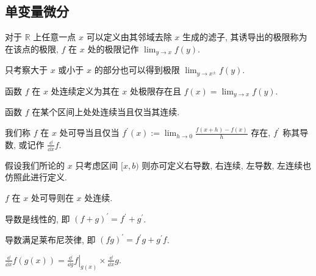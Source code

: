 \subsection{单变量微分}

\begin{definition}
    对于 \(\mathbb{R}\) 上任意一点 \(x\) 可以定义由其邻域去除 \(x\) 生成的滤子,
    其诱导出的极限称为在该点的极限, \(f\) 在 \(x\) 处的极限记作 \(\lim_{y \to x} f(y)\).
\end{definition}

\begin{definition}
    只考察大于 \(x\) 或小于 \(x\) 的部分也可以得到极限 \(\lim_{y \to x^\pm} f(y)\).
\end{definition}

\begin{definition}
    函数 \(f\) 在 \(x\) 处连续定义为其在 \(x\) 处极限存在且 \(f(x) = \lim_{y \to x} f(y)\).
\end{definition}

\begin{corollary}
    函数 \(f\) 在某个区间上处处连续当且仅当其连续.
\end{corollary}

\begin{definition}[导数]
    我们称 \(f\) 在 \(x\) 处可导当且仅当 \(f^\prime (x) := \lim_{h \to 0} \frac{f(x+h) - f(x)}{h}\) 存在,
    \(f^\prime\) 称其导数, 或记作 \(\frac{\dd}{\dd x} f\).
\end{definition}

\begin{remark}
    假设我们所论的 \(x\) 只考虑区间 \([x,b)\) 则亦可定义右导数, 右连续, 左导数, 左连续也仿照此进行定义.
\end{remark}

\begin{corollary}
    \(f\) 在 \(x\) 处可导则在 \(x\) 处连续.
\end{corollary}

\begin{corollary}
    导数是线性的, 即 \({(f+g)}^\prime = f^\prime + g^\prime\).
\end{corollary}

\begin{corollary}[Leibniz]
    导数满足莱布尼茨律, 即 \({(fg)}^\prime = f^\prime g + g^\prime f\).
\end{corollary}

\begin{corollary}[链式法则]
    \(\frac{\dd}{\dd x} {f(g(x))} = \left. \frac{\dd}{\dd g} f \right|_{g(x)} \times \frac{\dd}{\dd x} g\).
\end{corollary}

